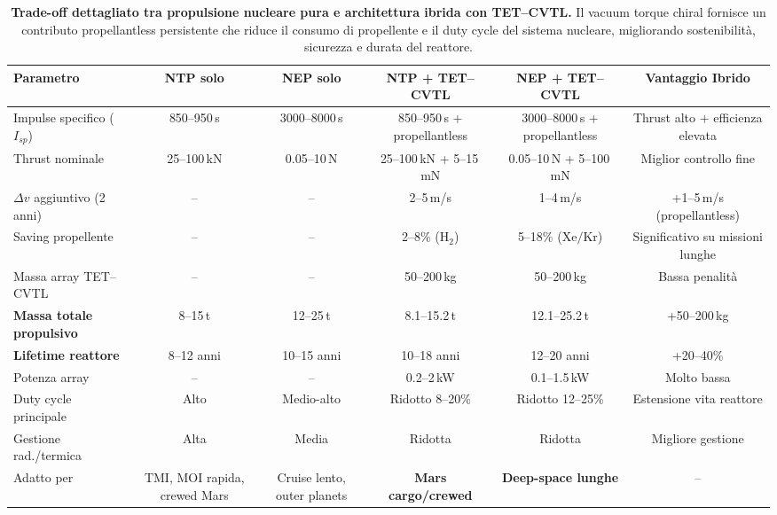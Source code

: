 \documentclass[11pt,a4paper]{article}
\theoremstyle{plain}
\theoremstyle{definition}
\begin{document}
\begin{table}[H]
\centering
\begin{adjustbox}{max width=\textwidth}
\small
{}
\begin{tabular}{lccccc}
\toprule
\rowcolor{cyan!12}
\textbf{Parametro} & 
\textbf{NTP solo} & 
\textbf{NEP solo} & 
\textbf{NTP + TET--CVTL} & 
\textbf{NEP + TET--CVTL} & 
\textbf{Vantaggio Ibrido} \\
\midrule
Impulse specifico (\(I_{sp}\)) & 850--950\,s & 3000--8000\,s & 850--950\,s + propellantless & 3000--8000\,s + propellantless & Thrust alto + efficienza elevata \\
Thrust nominale & 25--100\,kN & 0.05--10\,N & 25--100\,kN + 5--15\,mN & 0.05--10\,N + 5--100\,mN & Miglior controllo fine \\
\(\Delta v\) aggiuntivo (2 anni) & -- & -- & 2--5\,m/s & 1--4\,m/s & +1--5\,m/s (propellantless) \\
Saving propellente & -- & -- & 2--8\% (\(\mathrm{H_2}\)) & 5--18\% (\(\mathrm{Xe/Kr}\)) & Significativo su missioni lunghe \\
Massa array TET--CVTL & -- & -- & 50--200\,kg & 50--200\,kg & Bassa penalità \\
\textbf{Massa totale propulsivo} & 8--15\,t & 12--25\,t & 8.1--15.2\,t & 12.1--25.2\,t & +50--200\,kg \\
\textbf{Lifetime reattore} & 8--12 anni & 10--15 anni & 10--18 anni & 12--20 anni & +20--40\% \\
Potenza array & -- & -- & 0.2--2\,kW & 0.1--1.5\,kW & Molto bassa \\
Duty cycle principale & Alto & Medio-alto & Ridotto 8--20\% & Ridotto 12--25\% & Estensione vita reattore \\
Gestione rad./termica & Alta & Media & Ridotta & Ridotta & Migliore gestione \\
Adatto per & TMI, MOI rapida, crewed Mars & Cruise lento, outer planets & \textbf{Mars cargo/crewed} & \textbf{Deep-space lunghe} & -- \\
\bottomrule
\end{tabular}
\end{adjustbox}
\caption{\textbf{Trade-off dettagliato tra propulsione nucleare pura e architettura ibrida con TET--CVTL.} 
Il vacuum torque chiral fornisce un contributo propellantless persistente che riduce il consumo di propellente e il duty cycle del sistema nucleare, migliorando sostenibilità, sicurezza e durata del reattore.}
\label{tab:nuclear_tetcvtl_tradeoff}
\end{table}
\end{document}
